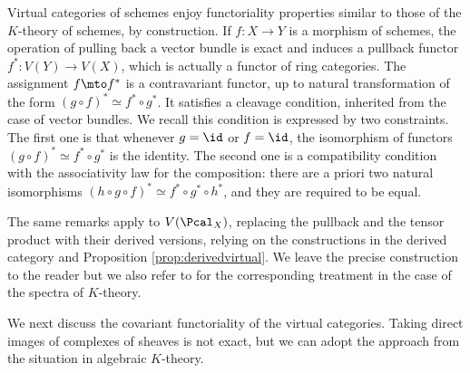 Virtual categories of schemes enjoy functoriality properties similar to those of the $K$-theory of schemes, by construction. If $f\colon X\to Y$ is a morphism of schemes, the operation of pulling back a vector bundle is exact and induces a pullback functor $f^\ast: V(Y) \to V(X)$, which is actually a functor of ring categories. The assignment $f\mto f^{\ast}$ is a contravariant functor, up to natural transformation of the form $(g\circ f)^{\ast}\simeq f^{\ast}\circ g^{\ast}$. It satisfies a cleavage condition, inherited from the case of vector bundles. We recall this condition is expressed by two constraints. The first one is that whenever $g=\id$ or $f=\id$, the isomorphism of functors $(g\circ f)^{\ast}\simeq f^{\ast}\circ g^{\ast}$ is the identity. The second one is a compatibility condition with the associativity law for the composition: there are a priori two natural isomorphisms $(h\circ g\circ f)^{\ast}\simeq f^{\ast}\circ g^{\ast}\circ h^{\ast}$, and they are required to be equal.

The same remarks apply to $V(\Pcal_X)$, replacing the pullback and the tensor product with their derived versions, relying on the constructions in the derived category and Proposition \ref{prop:derivedvirtual}. We leave the precise construction to the reader but we also refer to \cite[, ]{ThomasonTrobaugh} for the corresponding treatment in the case of the spectra of $K$-theory.

We next discuss the covariant functoriality of the virtual categories. Taking direct images of complexes of sheaves is not exact, but we can adopt the approach from the situation in algebraic $K$-theory.

